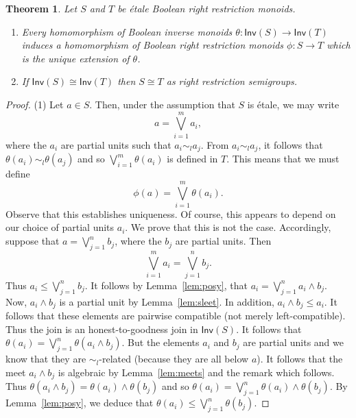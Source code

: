 \documentclass[a4paper]{amsart}
\newtheorem{theorem}{Theorem}[section]
\begin{document}
\begin{theorem}\label{them:one} Let $S$ and $T$ be \'etale Boolean right restriction monoids.
\begin{enumerate}

\item Every homomorphism of Boolean inverse monoids $\theta \colon \mathsf{Inv}(S) \rightarrow \mathsf{Inv}(T)$ 
induces a homomorphism of Boolean right restriction monoids $\phi \colon S \rightarrow T$ which is the unique extension of $\theta$.

\item If $\mathsf{Inv}(S) \cong \mathsf{Inv}(T)$ then $S \cong T$ as right restriction semigroups.

\end{enumerate}
\end{theorem}
\begin{proof} (1) 
Let $a \in S$. 
Then, under the assumption that $S$ is \'etale, we may write 
$$a = \bigvee_{i=1}^{m} a_{i},$$
where the $a_{i}$ are partial units such that $a_{i} \sim_{l} a_{j}$.
From $a_{i} \sim_{l} a_{j}$, it follows that $\theta (a_{i}) \sim_{l} \theta (a_{j})$
and so $\bigvee_{i=1}^{m} \theta (a_{i})$ is defined in $T$.
This means that we must define 
$$\phi (a) = \bigvee_{i=1}^{m} \theta (a_{i}).$$
Observe that this establishes uniqueness.
Of course, this appears to depend on our choice of partial units $a_{i}$.
We prove that this is not the case.
Accordingly, suppose that $a = \bigvee_{j=1}^{n} b_{j}$,
where the $b_{j}$ are partial units.
Then
$$\bigvee_{i=1}^{m} a_{i} =  \bigvee_{j=1}^{n} b_{j}.$$
Thus $a_{i} \leq  \bigvee_{j=1}^{n} b_{j}$.
It follows by Lemma~\ref{lem:posy}, that
$a_{i} =  \bigvee_{j=1}^{n} a_{i} \wedge b_{j}$.
Now, $a_{i} \wedge b_{j}$ is a partial unit by Lemma~\ref{lem:sleet}.
In addition, $a_{i} \wedge b_{j} \leq a_{i}$.
It follows that these elements are pairwise compatible (not merely left-compatible).
Thus the join is an honest-to-goodness join in $\mathsf{Inv}(S)$.
It follows that $\theta (a_{i}) =  \bigvee_{j=1}^{n} \theta (a_{i} \wedge b_{j})$.
But the elements $a_{i}$ and $b_{j}$ are partial units and we know that they are $\sim_{l}$-related
(because they are all below $a$).
It follows that the meet $a_{i} \wedge b_{j}$ is algebraic by
Lemma~\ref{lem:meets} and the remark which follows.
Thus $\theta (a_{i} \wedge b_{j}) = \theta (a_{i}) \wedge \theta (b_{j})$
and so $\theta (a_{i}) =  \bigvee_{j=1}^{n} \theta (a_{i}) \wedge \theta (b_{j})$.
By Lemma~\ref{lem:posy}, we deduce that $\theta (a_{i}) \leq \bigvee_{j=1}^{n} \theta (b_{j})$.

\end{proof}
\end{document}
